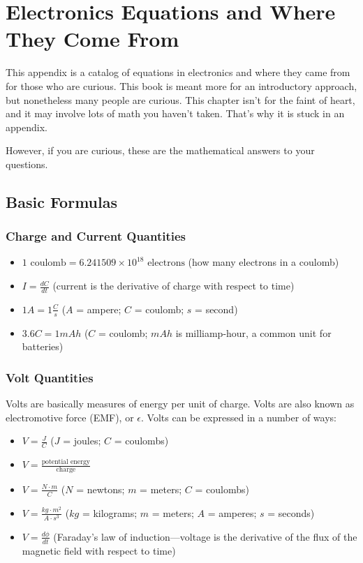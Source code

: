 \chapter{Electronics Equations and Where They Come From}
\label{appendixElectronicsEquations}

This appendix is a catalog of equations in electronics and where they came from for those who are curious.
This book is meant more for an introductory approach, but nonetheless many people are curious.
This chapter isn't for the faint of heart, and it may involve lots of math you haven't taken.
That's why it is stuck in an appendix.

However, if you are curious, these are the mathematical answers to your questions.

\section{Basic Formulas}

\subsection{Charge and Current Quantities}

\begin{itemize}
\item $1\textrm{ coulomb}  = 6.241509×10^18\textrm{ electrons}$ (how many electrons in a coulomb)
\item $I = \frac{dC}{dt}$ (current is the derivative of charge with respect to time)
\item $1A = 1\frac{C}{s}$ ($A$ = ampere; $C$ = coulomb; $s$ = second)
\item $3.6C = 1 mAh$ ($C$ = coulomb; $mAh$ is milliamp-hour,  a common unit for batteries)
\end{itemize}

\subsection{Volt Quantities}

Volts are basically measures of energy per unit of charge. Volts are also known as electromotive force (EMF), or $\epsilon$.  Volts can be expressed in a number of ways:

\begin{itemize}
\item $V = \frac{J}{C}$ ($J$ = joules; $C$ = coulombs)
\item $V = \frac{\textrm{potential energy}}{\textrm{charge}}$
\item $V = \frac{N\cdot m}{C}$ ($N$ = newtons; $m$ = meters; $C$ = coulombs)
\item $V = \frac{kg\cdot m^2}{A\cdot s^3}$ ($kg$ = kilograms; $m$ = meters; $A$ = amperes; $s$ = seconds)
\item $V = \frac{d\phi}{dt}$ (Faraday's law of induction---voltage is the derivative of the flux of the magnetic field with respect to time)
\end{itemize}

